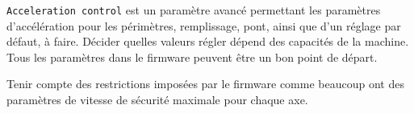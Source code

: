 \texttt{Acceleration control} est un param\`etre avanc\'e permettant les param\`etres d'acc\'el\'eration pour les p\'erim\`etres, remplissage, pont, ainsi que d'un r\'eglage par d\'efaut, \`a faire. D\'ecider quelles valeurs r\'egler d\'epend des capacit\'es de la machine. Tous les param\`etres dans le firmware peuvent \^etre un bon point de d\'epart.

Tenir compte des restrictions impos\'ees par le firmware comme beaucoup ont des param\`etres de vitesse de s\'ecurit\'e maximale pour chaque axe.

